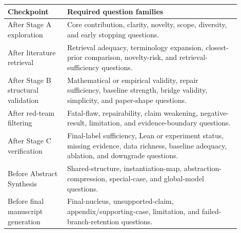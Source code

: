 \documentclass[11pt]{article}
\begin{document}
\begin{center}
\begin{tabular}{p{0.23\linewidth} p{0.67\linewidth}}
\toprule
Checkpoint & Required question families \\
\midrule
After Stage A exploration & Core contribution, clarity, novelty, scope, diversity, and early stopping questions. \\
After literature retrieval & Retrieval adequacy, terminology expansion, closest-prior comparison, novelty-risk, and retrieval-sufficiency questions. \\
After Stage B structural validation & Mathematical or empirical validity, repair sufficiency, baseline strength, bridge validity, simplicity, and paper-shape questions. \\
After red-team filtering & Fatal-flaw, repairability, claim weakening, negative-result, limitation, and evidence-boundary questions. \\
After Stage C verification & Final-label sufficiency, Lean or experiment status, missing evidence, data richness, baseline adequacy, ablation, and downgrade questions. \\
Before Abstract Synthesis & Shared-structure, instantiation-map, abstraction-compression, special-case, and global-model questions. \\
Before final manuscript generation & Final-nucleus, unsupported-claim, appendix/supporting-case, limitation, and failed-branch-retention questions. \\
\bottomrule
\end{tabular}
\end{center}
\end{document}
